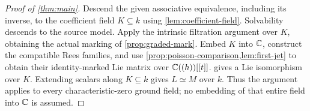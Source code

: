 \begin{proof}[Proof of \cref{thm:main}]
Descend the given associative equivalence, including its inverse, to the
coefficient field $K\subseteq k$ using \cref{lem:coefficient-field}.
Solvability descends to the source model. Apply the intrinsic filtration
argument over $K$, obtaining the actual marking of
\cref{prop:graded-mark}. Embed $K$ into $\mathbb C$, construct the compatible
Rees families, and use \cref{prop:poisson-comparison,lem:first-jet} to
obtain their identity-marked Lie matrix over $\mathbb C((h))[[t]]$.
 gives a Lie isomorphism over $K$. Extending
scalars along $K\subseteq k$ gives $L\simeq M$ over
$k$. Thus the argument applies to every characteristic-zero ground field;
no embedding of that entire field into $\mathbb C$ is assumed.
\end{proof}
